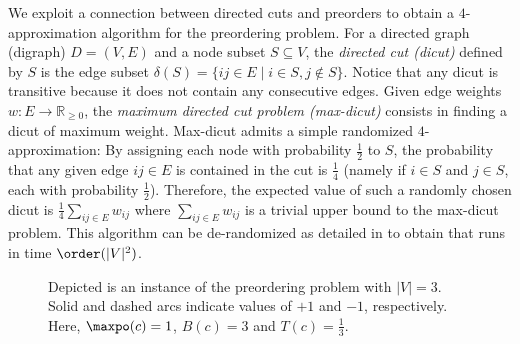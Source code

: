 We exploit a connection between directed cuts and preorders to obtain a $4$-approximation algorithm for the preordering problem.
For a directed graph (digraph) $D = (V, E)$ and a node subset $S \subseteq V$, the \emph{directed cut (dicut)} defined by $S$ is the edge subset $\delta(S) = \{ij \in E \mid i \in S, j \notin S\}$.
Notice that any dicut is transitive because it does not contain any consecutive edges.
Given edge weights $w\colon E \to \mathbb{R}_{\geq 0}$, the \emph{maximum directed cut problem (max-dicut)} consists in finding a dicut of maximum weight.
Max-dicut admits a simple randomized $4$-approximation: 
By assigning each node with probability $\frac{1}{2}$ to $S$, the probability that any given edge $ij \in E$ is contained in the cut is $\frac{1}{4}$ (namely if $i \in S$ and $j \in S$, each with probability $\frac{1}{2}$).
Therefore, the expected value of such a randomly chosen dicut is $\frac{1}{4} \sum_{ij \in E} w_{ij}$ where $\sum_{ij \in E} w_{ij}$ is a trivial upper bound to the max-dicut problem.
This algorithm can be de-randomized \citep{halperin2001combinatorial,bar2012online} as detailed in  to obtain  that runs in time $\order(|V|^2)$.

\begin{figure}
    \center
    \caption{Depicted is an instance of the preordering problem with $|V|=3$. 
    Solid and dashed arcs indicate values of $+1$ and $-1$, respectively.
    Here, $\maxpo(c) = 1$, $B(c) = 3$ and $T(c) = \frac{1}{3}$.}
    \label{fig:chorded-three-cycle}
\end{figure}

